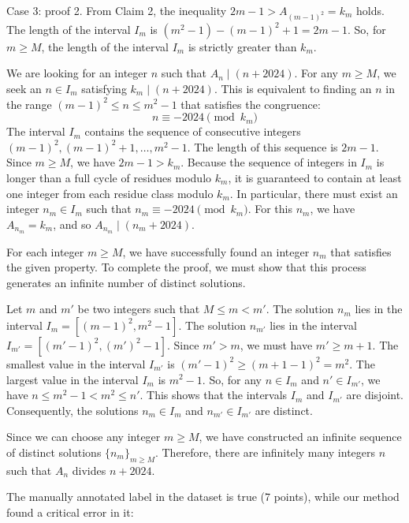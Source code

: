 \documentclass{article} %
\begin{document}
\begin{promptbox}{Case 3: proof}
2.  From Claim 2, the inequality $2m-1 > A_{(m-1)^2} = k_m$ holds.
    The length of the interval $I_m$ is $(m^2-1) - (m-1)^2 + 1 = 2m-1$.
    So, for $m \ge M$, the length of the interval $I_m$ is strictly greater than $k_m$.

We are looking for an integer $n$ such that $A_n \mid (n+2024)$. For any $m \ge M$, we seek an $n \in I_m$ satisfying $k_m \mid (n+2024)$. This is equivalent to finding an $n$ in the range $(m-1)^2 \le n \le m^2-1$ that satisfies the congruence:
$$n \equiv -2024 \pmod{k_m}$$
The interval $I_m$ contains the sequence of consecutive integers $(m-1)^2, (m-1)^2+1, \dots, m^2-1$. The length of this sequence is $2m-1$. Since $m \ge M$, we have $2m-1 > k_m$. Because the sequence of integers in $I_m$ is longer than a full cycle of residues modulo $k_m$, it is guaranteed to contain at least one integer from each residue class modulo $k_m$.
In particular, there must exist an integer $n_m \in I_m$ such that $n_m \equiv -2024 \pmod{k_m}$.
For this $n_m$, we have $A_{n_m} = k_m$, and so $A_{n_m} \mid (n_m+2024)$.

For each integer $m \ge M$, we have successfully found an integer $n_m$ that satisfies the given property. To complete the proof, we must show that this process generates an infinite number of distinct solutions.

Let $m$ and $m'$ be two integers such that $M \le m < m'$.
The solution $n_m$ lies in the interval $I_m = [(m-1)^2, m^2-1]$.
The solution $n_{m'}$ lies in the interval $I_{m'} = [(m'-1)^2, (m')^2-1]$.
Since $m' > m$, we must have $m' \ge m+1$.
The smallest value in the interval $I_{m'}$ is $(m'-1)^2 \ge (m+1-1)^2 = m^2$.
The largest value in the interval $I_m$ is $m^2-1$.
So, for any $n \in I_m$ and $n' \in I_{m'}$, we have $n \le m^2-1 < m^2 \le n'$. This shows that the intervals $I_m$ and $I_{m'}$ are disjoint.
Consequently, the solutions $n_m \in I_m$ and $n_{m'} \in I_{m'}$ are distinct.

Since we can choose any integer $m \ge M$, we have constructed an infinite sequence of distinct solutions $\{n_m\}_{m \ge M}$.
Therefore, there are infinitely many integers $n$ such that $A_n$ divides $n+2024$.
\end{promptbox}

The manually annotated label in the dataset is true (7 points), while our method found a critical error in it:
\end{document}
